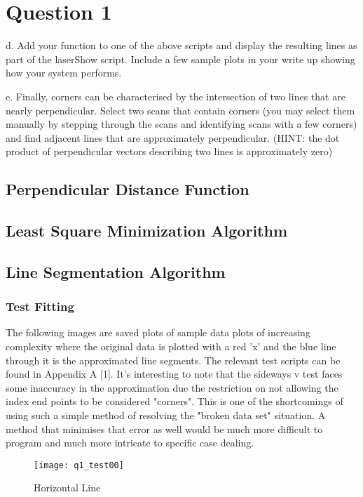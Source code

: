 \newpage
\section{Question 1}
	
	
	d. Add your function to one of the above scripts and display the resulting lines as part of the laserShow script.  Include a few sample plots in your write up showing how your system performs. 
	
	
	e. Finally, corners can be characterised by the intersection of two lines that are nearly perpendicular.  Select two scans that contain corners (you may select them manually by stepping through the scans and identifying scans with a few corners) and find adjacent lines that are approximately perpendicular. (HINT: the dot product of perpendicular vectors describing two lines is approximately zero) 
	\subsection{Perpendicular Distance Function}	%
		
		\pagebreak
	\subsection{Least Square Minimization Algorithm}	%
		
		\pagebreak
	\subsection{Line Segmentation Algorithm}	%
		
		\linebreak
		\newline
		\subsubsection{Test Fitting}
			The following images are saved plots of sample data plots of increasing complexity where the original data is plotted with a red 'x' and the blue line through it is the approximated line segments. The relevant test scripts can be found in Appendix A [1].
			It's interesting to note that the sideways v test faces some inaccuracy in the approximation due the restriction on not allowing the index end points to be considered "corners". This is one of the shortcomings of using such a simple method of resolving the "broken data set" situation. A method that minimises that error as well would be much more difficult to program and much more intricate to specific case dealing.
			\begin{figure}[position = here]
				\begin{centering}
					\texttt{[image: q1\_test00]}\\
					\caption[\textit{RPYAxes}]{Horizontal Line}
				\end{centering}
			\end{figure}
			\newline
			
